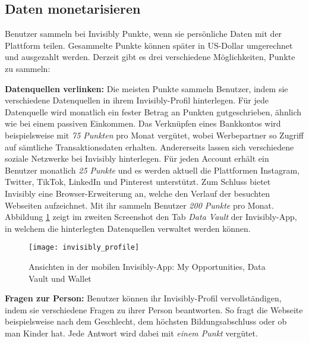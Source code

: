 \subsection{Daten monetarisieren}
Benutzer sammeln bei Invisibly Punkte, wenn sie persönliche Daten mit der Plattform teilen. Gesammelte Punkte können später in US-Dollar umgerechnet und ausgezahlt werden. Derzeit gibt es drei verschiedene Möglichkeiten, Punkte zu sammeln: \newline

\noindent \textbf{Datenquellen verlinken:} Die meisten Punkte sammeln Benutzer, indem sie verschiedene Datenquellen in ihrem Invisibly-Profil hinterlegen. Für jede Datenquelle wird monatlich ein fester Betrag an Punkten gutgeschrieben, ähnlich wie bei einem passiven Einkommen. \cite{pymntsInvisibly_2021} Das Verknüpfen eines Bankkontos wird beispielsweise mit \textit{75 Punkten} pro Monat vergütet, wobei Werbepartner so Zugriff auf sämtliche Transaktionsdaten erhalten. Andererseits lassen sich verschiedene soziale Netzwerke bei Invisibly hinterlegen. Für jeden Account erhält ein Benutzer monatlich \textit{25 Punkte} und es werden aktuell die Plattformen Instagram, Twitter, TikTok, LinkedIn und Pinterest unterstützt. Zum Schluss bietet Invisibly eine Browser-Erweiterung an, welche den Verlauf der besuchten Webseiten aufzeichnet. Mit ihr sammeln Benutzer \textit{200 Punkte} pro Monat. \cite{instagramInvisibly_2021, lifewireInvisibly_2021} Abbildung \ref{fig:invisiblyProfile} zeigt im zweiten Screenshot den Tab \textit{Data Vault} der Invisibly-App, in welchem die hinterlegten Datenquellen verwaltet werden können. \newline

\begin{figure}[!ht]
	\centering
	\texttt{[image: invisibly\_profile]}
	\caption{Ansichten in der mobilen Invisibly-App: My Opportunities, Data Vault und Wallet \cite{behanceInvisibly_2021}}
	\label{fig:invisiblyProfile}
\end{figure}

\noindent \textbf{Fragen zur Person:} Benutzer können ihr Invisibly-Profil vervollständigen, indem sie verschiedene Fragen zu ihrer Person beantworten. So fragt die Webseite beispielsweise nach dem Geschlecht, dem höchsten Bildungsabschluss oder ob man Kinder hat. Jede Antwort wird dabei mit \textit{einem Punkt} vergütet. \cite{instagramInvisibly_2021} \newline

